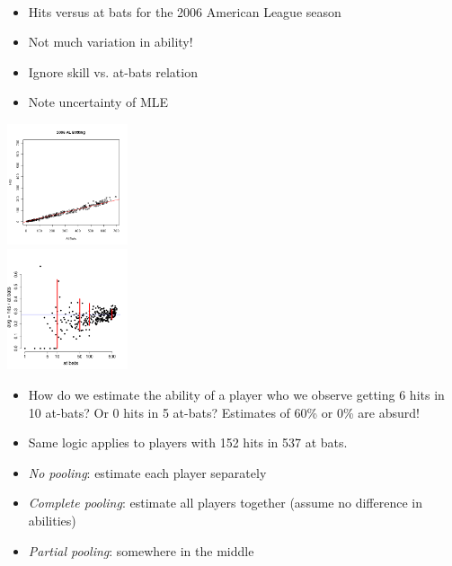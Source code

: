 \documentclass[10pt]{report}
\begin{document}
\\
%
\begin{minipage}[t]{0.49\textwidth}
\begin{itemize}
\item Hits versus at bats for the 2006 American League season
\item Not much variation in ability!
\item Ignore skill vs. at-bats relation
\item Note uncertainty of MLE
\end{itemize}
\end{minipage}
%
\begin{minipage}[t]{0.50\textwidth}
\begin{center}
\vspace*{-36pt}
\hfill \includegraphics[height=1.4in]{img/al06hitsvsatbats.png}
\\[-18pt]
\hfill \includegraphics[height=1.4in]{img/bball-eda.pdf}
\end{center}
\end{minipage}

\begin{itemize}
\item How do we estimate the ability of a player who we observe
  getting 6 hits in 10 at-bats?  Or 0 hits in 5 at-bats?  Estimates of
  60\% or 0\% are absurd!
\item Same logic applies to players with 152 hits in 537 at bats.
\item \emph{No pooling}: estimate each player separately
\item \emph{Complete pooling}: estimate all players together (assume no difference
  in abilities)
\item \emph{Partial pooling}: somewhere in the middle
\end{itemize}
\end{document}
